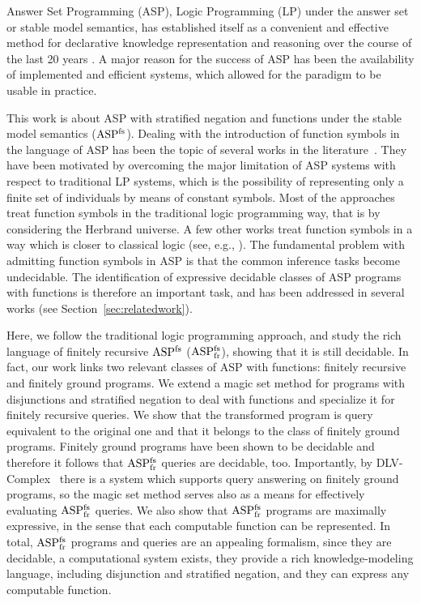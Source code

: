 \documentclass{tlp}
\newcommand{\dlv}{{\sc DLV}\xspace}
\newcommand{\ASPFN}{\ensuremath{\rm ASP^{\rm fs}}}
\newcommand{\ASPFNFR}{\ensuremath{\rm ASP^{\rm fs}_{\rm fr}}}
\begin{document}
Answer Set Programming (ASP), Logic Programming (LP) under the answer set
or stable model semantics, has established itself as a convenient and
effective method for declarative knowledge representation and
reasoning over the course of the last 20 years
\cite{bara-2002,gelf-lifs-91}. A major reason for the success of ASP
has been the availability of implemented and efficient systems, which
allowed for the paradigm to be usable in practice.


This work is about ASP with stratified negation
and functions under the stable model semantics (\ASPFN). Dealing with
the introduction of function symbols in the language of ASP has been
the topic of several works in the
literature~\cite{bona-02-iclp,bona-04,base-etal-2009-tplp,cali-etal-2009-lpnmr,syrj-2001,gebs-etal-2007-lpnmr,cali-etal-2008-iclp,lier-lifs-2009-iclp,simk-eite-2007-lpar,eite-simk-2009-ijcai,lin-wang-2008-KR,caba-2008-iclp}.
They have been motivated by overcoming the major limitation of ASP systems with respect to traditional LP systems, which is the possibility of representing only a finite set of individuals by means of constant symbols. Most of the approaches treat
function symbols in the traditional logic programming way, that is by
considering the Herbrand universe. A few other works treat function
symbols in a way which is closer to classical logic (see, e.g., \cite{caba-2008-iclp}). 
The fundamental problem with admitting function symbols in ASP is that
the common inference tasks become undecidable. The identification of
expressive decidable classes of ASP programs with functions is
therefore an important task, and has been addressed in several works
(see Section~\ref{sec:relatedwork}). 


Here, we follow the traditional logic programming approach, and study
the rich language of finitely recursive \ASPFN
(\ASPFNFR), showing that it is still decidable.
In fact, our work links two 
relevant
classes of ASP with functions: finitely recursive and
finitely ground programs. We extend a magic set method for programs
with disjunctions and stratified negation to deal with functions and
specialize it for finitely recursive queries. We show that the
transformed program is query equivalent to the original one and that
it belongs to the class of finitely ground programs. Finitely ground
programs have been shown to be decidable and therefore it follows that
\ASPFNFR{} queries are decidable, too.
Importantly, by \dlv-Complex~\cite{dlvcomplex-web}
there is a system which supports query answering on finitely ground
programs, so the magic set method serves also as a means for
effectively evaluating \ASPFNFR{} queries. We also show that
\ASPFNFR{} programs are maximally expressive, in the sense that each
computable function can be represented. In total, \ASPFNFR{} programs
and queries are an appealing formalism, since they are decidable, a
computational system exists, they provide a rich knowledge-modeling
language, including disjunction and stratified negation, and they can express any
computable function.
\end{document}
